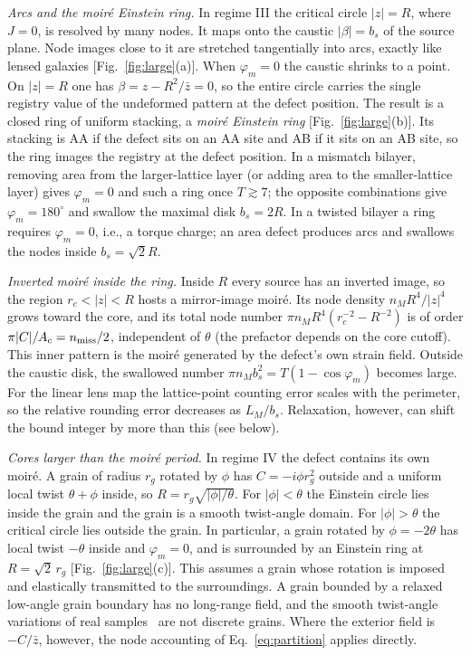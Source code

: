 \documentclass[prb,twocolumn,superscriptaddress,floatfix,10pt]{revtex4-2}
\begin{document}
\emph{Arcs and the moir\'e Einstein ring.} In regime III the critical circle $|z|=R$, where $J=0$, is resolved by many nodes. It maps onto the caustic $|\beta|=b_s$ of the source plane. Node images close to it are stretched tangentially into arcs, exactly like lensed galaxies [Fig.~\ref{fig:large}(a)]. When $\varphi_m=0$ the caustic shrinks to a point. On $|z|=R$ one has $\beta=z-R^2/\bar z=0$, so the entire circle carries the single registry value of the undeformed pattern at the defect position. The result is a closed ring of uniform stacking, a \emph{moir\'e Einstein ring} [Fig.~\ref{fig:large}(b)]. Its stacking is AA if the defect sits on an AA site and AB if it sits on an AB site, so the ring images the registry at the defect position. In a mismatch bilayer, removing area from the larger-lattice layer (or adding area to the smaller-lattice layer) gives $\varphi_m=0$ and such a ring once $T\gtrsim7$; the opposite combinations give $\varphi_m=180^\circ$ and swallow the maximal disk $b_s=2R$. In a twisted bilayer a ring requires $\varphi_m=0$, i.e., a torque charge; an area defect produces arcs and swallows the nodes inside $b_s=\sqrt2R$.

\emph{Inverted moir\'e inside the ring.} Inside $R$ every source has an inverted image, so the region $r_c<|z|<R$ hosts a mirror-image moir\'e. Its node density $n_MR^4/|z|^4$ grows toward the core, and its total node number $\pi n_MR^4(r_c^{-2}-R^{-2})$ is of order $\pi|C|/A_c=n_{\rm miss}/2$, independent of $\theta$ (the prefactor depends on the core cutoff). This inner pattern is the moir\'e generated by the defect's own strain field. Outside the caustic disk, the swallowed number $\pi n_Mb_s^2=T(1-\cos\varphi_m)$ becomes large. For the linear lens map the lattice-point counting error scales with the perimeter, so the relative rounding error decreases as $L_M/b_s$. Relaxation, however, can shift the bound integer by more than this (see below).

\emph{Cores larger than the moir\'e period.} In regime IV the defect contains its own moir\'e. A grain of radius $r_g$ rotated by $\phi$ has $C=-i\phi r_g^2$ outside and a uniform local twist $\theta+\phi$ inside, so $R=r_g\sqrt{|\phi|/\theta}$. For $|\phi|<\theta$ the Einstein circle lies inside the grain and the grain is a smooth twist-angle domain. For $|\phi|>\theta$ the critical circle lies outside the grain. In particular, a grain rotated by $\phi=-2\theta$ has local twist $-\theta$ inside and $\varphi_m=0$, and is surrounded by an Einstein ring at $R=\sqrt2\,r_g$ [Fig.~\ref{fig:large}(c)]. This assumes a grain whose rotation is imposed and elastically transmitted to the surroundings. A grain bounded by a relaxed low-angle grain boundary has no long-range field, and the smooth twist-angle variations of real samples~\cite{Uri2020} are not discrete grains. Where the exterior field is $-C/\bar z$, however, the node accounting of Eq.~\eqref{eq:partition} applies directly.
\end{document}
